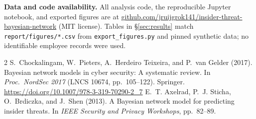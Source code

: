\documentclass[11pt,a4paper]{article}
\begin{document}
\noindent\textbf{Data and code availability.}
All analysis code, the reproducible Jupyter notebook, and exported figures are at \href{https://github.com/jruijgrok141/insider-threat-bayesian-network}{github.com/jruijgrok141/insider-threat-bayesian-network} (MIT license). Tables in \S\ref{sec:results} match \texttt{report/figures/*.csv} from \texttt{export\_figures.py} and pinned synthetic data; no identifiable employee records were used.

\clearpage

\begin{thebibliography}{2}
S.~Chockalingam, W.~Pieters, A.~Herdeiro Teixeira, and P.~van Gelder (2017).
Bayesian network models in cyber security: A systematic review.
In \emph{Proc.\ NordSec 2017} (LNCS 10674, pp.\ 105--122).
Springer. \url{https://doi.org/10.1007/978-3-319-70290-2_7}
E.~T. Axelrad, P.~J. Sticha, O.~Brdiczka, and J.~Shen (2013).
A Bayesian network model for predicting insider threats.
In \emph{IEEE Security and Privacy Workshops}, pp.\ 82--89.
\end{thebibliography}
\end{document}
